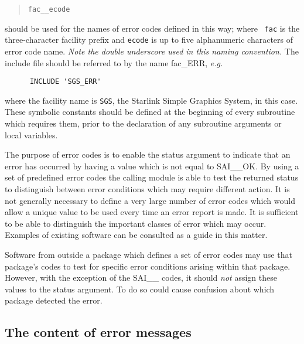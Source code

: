 \begin {quote}
\begin {small}
\begin{verbatim}
fac__ecode
\end{verbatim}
\end {small}
\end {quote}

should be used for the names of error codes defined in this way; where {\tt
fac} is the three-character facility prefix and {\tt ecode} is up to five
alphanumeric characters of error code name. 
{\em Note the double underscore used in this naming convention.}
The include file should be referred to by the name fac\_ERR, {\em e.g.}

\begin {small}
\begin{verbatim}
      INCLUDE 'SGS_ERR'
\end{verbatim}
\end {small}

where the facility name is {\tt SGS}, the Starlink Simple Graphics System,
in this case. 
These symbolic constants should be defined at the beginning of every
subroutine which requires them, prior to the declaration of any subroutine
arguments or local variables. 

The purpose of error codes is to enable the status argument to indicate that an 
error has occurred by having a value which is not equal to SAI\_\_OK.
By using a set of predefined error codes the calling module is 
able to test the returned status to distinguish between error conditions 
which may require different action.
It is not generally necessary to define a very large number of error codes
which would allow a unique value to be used every time an error report is
made. 
It is sufficient to be able to distinguish the important classes of error which
may occur. 
Examples of existing software can be consulted as a guide in this matter.

Software from outside a package which defines a set of error codes may
use that package's codes to test for specific error conditions arising within
that package.
However, with the exception of the SAI\_\_ codes, it should {\em not} assign
these values to the status argument.
To do so could cause confusion about which package detected the error. 


\subsection {The content of error messages}

